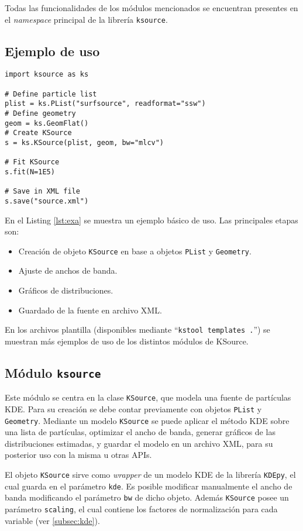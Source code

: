 Todas las funcionalidades de los módulos mencionados se encuentran presentes en el \emph{namespace} principal de la librería \verb|ksource|.


\subsection{Ejemplo de uso}

\begin{lstlisting}[language=Python2, label={lst:exa}, caption=Ejemplo básico de uso de API en Python.]
import ksource as ks

# Define particle list
plist = ks.PList("surfsource", readformat="ssw")
# Define geometry
geom = ks.GeomFlat()
# Create KSource
s = ks.KSource(plist, geom, bw="mlcv")

# Fit KSource
s.fit(N=1E5)

# Save in XML file
s.save("source.xml")
\end{lstlisting}

En el Listing \ref{lst:exa} se muestra un ejemplo básico de uso. Las principales etapas son:
\begin{itemize}
	\item Creación de objeto \verb|KSource| en base a objetos \verb|PList| y \verb|Geometry|.
	\item Ajuste de anchos de banda.
	\item Gráficos de distribuciones.
	\item Guardado de la fuente en archivo XML.
\end{itemize}

En los archivos plantilla (disponibles mediante ``\verb|kstool templates .|'') se muestran más ejemplos de uso de los distintos módulos de KSource.


\subsection{Módulo \texttt{ksource}}

Este módulo se centra en la clase \verb|KSource|, que modela una fuente de partículas KDE. Para su creación se debe contar previamente con objetos \verb|PList| y \verb|Geometry|. Mediante un modelo \verb|KSource| se puede aplicar el método KDE sobre una lista de partículas, optimizar el ancho de banda, generar gráficos de las distribuciones estimadas, y guardar el modelo en un archivo XML, para su posterior uso con la misma u otras APIs.

El objeto \verb|KSource| sirve como \emph{wrapper} de un modelo KDE de la librería \verb|KDEpy|, el cual guarda en el parámetro \verb|kde|. Es posible modificar manualmente el ancho de banda modificando el parámetro \verb|bw| de dicho objeto. Además \verb|KSource| posee un parámetro \verb|scaling|, el cual contiene los factores de normalización para cada variable (ver \ref{subsec:kde}).

